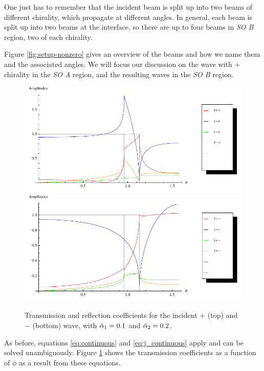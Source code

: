 One just has to remember that the incident beam is split up
into two beams of different chirality, which propagate at different
angles. In general, each beam is split up into two beams at the
interface, so there are up to four beams in \emph{SO B} region,
two of each chirality.

Figure \ref{fig:setup-nonzero} gives an overview of the beams and how
we name them and the associated angles. We will focus our discussion
on the wave with $+$ chirality in the \emph{SO A} region, and the
resulting waves in the \emph{SO B} region.

\begin{figure}
    \begin{center}
        \includegraphics[width=\textwidth]{nonzero-plus.pdf}
        \includegraphics[width=\textwidth]{nonzero-minus.pdf}
    \end{center}
    \caption{Transmission and reflection coefficients for the
        incident $+$ (top) and $-$ (bottom) wave, with
        $\tilde \alpha_1 = 0.1$ and $\tilde \alpha_2 = 0.2$.}
    \label{fig:plots-nonzero}
\end{figure}

As before, equations \ref{eq:continuous} and \ref{eq:j_continuous}
apply and can be solved unambiguously. Figure \ref{fig:plots-nonzero}
shows the transmission coefficients as a function of $\phi$ as a
result from these equations.

